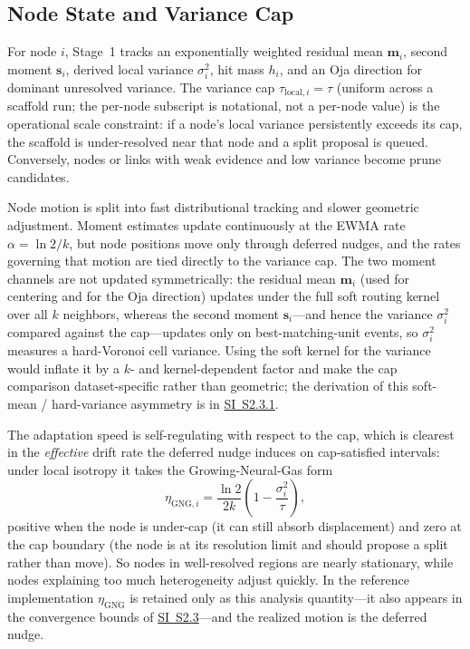 \documentclass[11pt]{article}
\theoremstyle{definition}
\theoremstyle{plain}
\begin{document}
\subsection{Node State and Variance Cap}
For node $i$, Stage~1 tracks an exponentially weighted residual mean $\mathbf m_i$, second moment $\mathbf s_i$, derived local variance $\sigma_i^2$, hit mass $h_i$, and an Oja direction for dominant unresolved variance. The variance cap $\tau_{\mathrm{local},i}=\tau$ (uniform across a scaffold run; the per-node subscript is notational, not a per-node value) is the operational scale constraint: if a node's local variance persistently exceeds its cap, the scaffold is under-resolved near that node and a split proposal is queued. Conversely, nodes or links with weak evidence and low variance become prune candidates.

Node motion is split into fast distributional tracking and slower geometric adjustment. Moment estimates update continuously at the EWMA rate $\alpha=\ln 2/k$, but node positions move only through deferred nudges, and the rates governing that motion are tied directly to the variance cap. The two moment channels are not updated symmetrically: the residual mean $\mathbf m_i$ (used for centering and for the Oja direction) updates under the full soft routing kernel over all $k$ neighbors, whereas the second moment $\mathbf s_i$---and hence the variance $\sigma_i^2$ compared against the cap---updates only on best-matching-unit events, so $\sigma_i^2$ measures a hard-Voronoi cell variance. Using the soft kernel for the variance would inflate it by a $k$- and kernel-dependent factor and make the cap comparison dataset-specific rather than geometric; the derivation of this soft-mean / hard-variance asymmetry is in \hyperref[sec:si-variational-interpretation]{SI~S2.3.1}.

The adaptation speed is self-regulating with respect to the cap, which is clearest in the \emph{effective} drift rate the deferred nudge induces on cap-satisfied intervals: under local isotropy it takes the Growing-Neural-Gas form
\[
\eta_{\mathrm{GNG},i}
=\frac{\ln 2}{2k}\!\left(1-\frac{\sigma_i^2}{\tau}\right),
\]
positive when the node is under-cap (it can still absorb displacement) and zero at the cap boundary (the node is at its resolution limit and should propose a split rather than move). So nodes in well-resolved regions are nearly stationary, while nodes explaining too much heterogeneity adjust quickly. In the reference implementation $\eta_{\mathrm{GNG}}$ is retained only as this analysis quantity---it also appears in the convergence bounds of \hyperref[sec:si-dual-rate-motion]{SI~S2.3}---and the realized motion is the deferred nudge.
\end{document}
